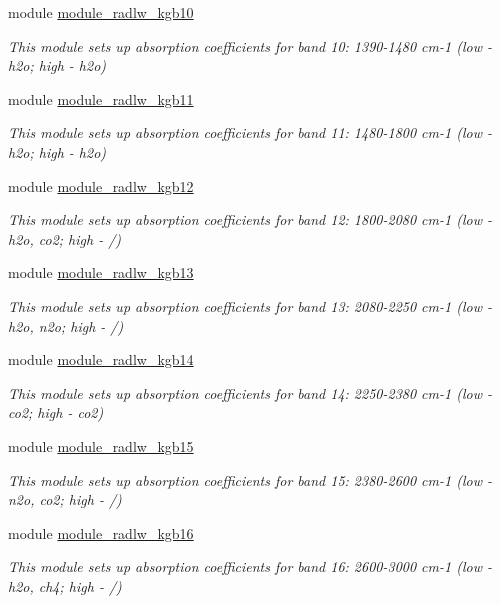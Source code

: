 \begin{DoxyCompactItemize}
module \hyperlink{namespacemodule__radlw__kgb10}{module\+\_\+radlw\+\_\+kgb10}
\begin{DoxyCompactList}\small\item\em This module sets up absorption coefficients for band 10\+: 1390-\/1480 cm-\/1 (low -\/ h2o; high -\/ h2o) \end{DoxyCompactList}\item 
module \hyperlink{namespacemodule__radlw__kgb11}{module\+\_\+radlw\+\_\+kgb11}
\begin{DoxyCompactList}\small\item\em This module sets up absorption coefficients for band 11\+: 1480-\/1800 cm-\/1 (low -\/ h2o; high -\/ h2o) \end{DoxyCompactList}\item 
module \hyperlink{namespacemodule__radlw__kgb12}{module\+\_\+radlw\+\_\+kgb12}
\begin{DoxyCompactList}\small\item\em This module sets up absorption coefficients for band 12\+: 1800-\/2080 cm-\/1 (low -\/ h2o, co2; high -\/ /) \end{DoxyCompactList}\item 
module \hyperlink{namespacemodule__radlw__kgb13}{module\+\_\+radlw\+\_\+kgb13}
\begin{DoxyCompactList}\small\item\em This module sets up absorption coefficients for band 13\+: 2080-\/2250 cm-\/1 (low -\/ h2o, n2o; high -\/ /) \end{DoxyCompactList}\item 
module \hyperlink{namespacemodule__radlw__kgb14}{module\+\_\+radlw\+\_\+kgb14}
\begin{DoxyCompactList}\small\item\em This module sets up absorption coefficients for band 14\+: 2250-\/2380 cm-\/1 (low -\/ co2; high -\/ co2) \end{DoxyCompactList}\item 
module \hyperlink{namespacemodule__radlw__kgb15}{module\+\_\+radlw\+\_\+kgb15}
\begin{DoxyCompactList}\small\item\em This module sets up absorption coefficients for band 15\+: 2380-\/2600 cm-\/1 (low -\/ n2o, co2; high -\/ /) \end{DoxyCompactList}\item 
module \hyperlink{namespacemodule__radlw__kgb16}{module\+\_\+radlw\+\_\+kgb16}
\begin{DoxyCompactList}\small\item\em This module sets up absorption coefficients for band 16\+: 2600-\/3000 cm-\/1 (low -\/ h2o, ch4; high -\/ /) \end{DoxyCompactList}\end{DoxyCompactItemize}
